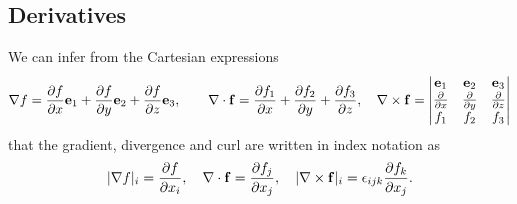\documentclass[10pt, a4paper]{article}
\begin{document}
\subsection{Derivatives}
We can infer from the Cartesian expressions
\[
\bnabla f = \pd[f]{x}\mbf{e}_1 + \pd[f]{y}\mbf{e}_2 + \pd[f]{z}\mbf{e}_3,\qquad\bnabla\cdot\mbf{f} = \pd[f_1]{x} + \pd[f_2]{y} + \pd[f_3]{z},\quad\bnabla \times \mbf{f} = \begin{vmatrix}
    \mbf{e}_1 & \mbf{e}_2 & \mbf{e}_3 \\
    \pd{x} & \pd{y} & \pd{z} \\
    f_1 & f_2 & f_3
\end{vmatrix}
\]
that the gradient,
divergence and curl are written in index notation as
\[
|\bnabla f|_i = \pd[f]{x_i},\quad\bnabla \cdot \mbf{f} = \pd[f_j]{x_j},\quad|\bnabla \times \mbf{f}|_i = \epsilon_{ijk}\pd[f_k]{x_j}.
\]
\end{document}
